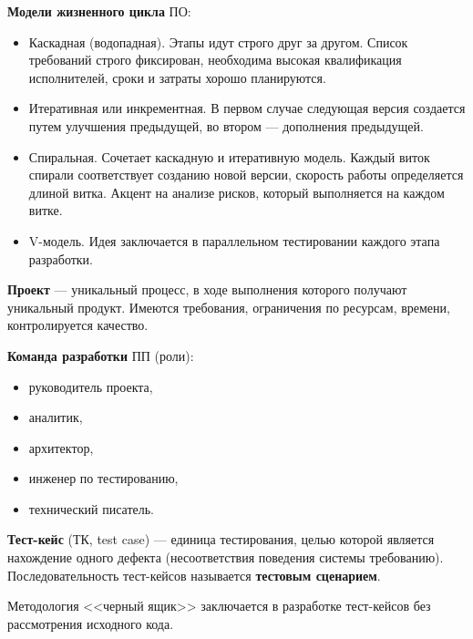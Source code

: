\textbf{Модели жизненного цикла} ПО:
\begin{itemize}
    \item Каскадная (водопадная). Этапы идут строго друг за другом. Список
        требований строго фиксирован, необходима высокая квалификация
        исполнителей, сроки и затраты хорошо планируются.


    \item Итеративная или инкрементная. В первом случае следующая версия
        создается путем улучшения предыдущей, во втором --- дополнения
        предыдущей.


    \item Спиральная. Сочетает каскадную и итеративную модель. Каждый виток
        спирали соответствует созданию новой версии, скорость работы
        определяется длиной витка. Акцент на анализе рисков, который
        выполняется на каждом витке.


    \item V-модель. Идея заключается в параллельном тестировании каждого этапа
        разработки.

\end{itemize}

\textbf{Проект} --- уникальный процесс, в ходе выполнения которого получают
уникальный продукт. Имеются требования, ограничения по ресурсам, времени,
контролируется качество.

\textbf{Команда разработки} ПП (роли):
\begin{itemize}
    \item руководитель проекта,
    \item аналитик,
    \item архитектор,
    \item инженер по тестированию,
    \item технический писатель.
\end{itemize}

\textbf{Тест-кейс} (ТК, test case) --- единица тестирования, целью которой
является нахождение одного дефекта (несоответствия поведения системы
требованию). Последовательность тест-кейсов называется \textbf{тестовым
сценарием}.

Методология <<черный ящик>> заключается в разработке тест-кейсов без
рассмотрения исходного кода.

